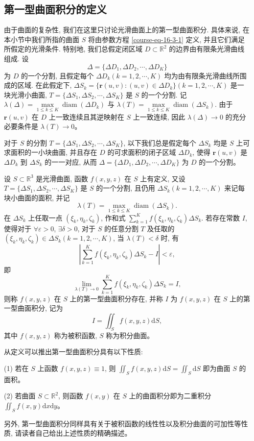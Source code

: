 \documentclass[12pt,fontset=fandol]{ctexart}
\begin{document}
\subsection{第一型曲面积分的定义}

由于曲面的复杂性, 我们在这里只讨论光滑曲面上的第一型曲面积分. 具体来说, 在本小节中我们所指的曲面 $S$ 将由参数方程 \eqref{course-eq-16-3-1}  定义, 并且它们满足所假定的光滑条件. 特别地, 我们总假定闭区域 $D\subset\mathbb R^2$ 的边界由有限条光滑曲线组成. 设
\[
  \Delta=\{\Delta D_1,\Delta D_2,\cdots,\Delta D_K\}
\]
为 $D$ 的一个分割, 且假定每个 $\Delta D_k(k=1,2,\cdots,K)$ 均为由有限条光滑曲线所围成的区域. 在此假定下, $\Delta S_k=\{\boldsymbol r(u,v):(u,v)\in\Delta D_k\}(k=1,2,\cdots,K)$ 是一块光滑小曲面, $T=\{\Delta S_1,\Delta S_2,\cdots,\Delta S_K\}$ 是 $S$ 的一个分割. 记 $\lambda(\Delta)=\max\limits_{1\leqslant k\leqslant K}\operatorname{diam}(\Delta D_k)$ 与 $\lambda(T)=\max\limits_{1\leqslant k\leqslant K}\operatorname{diam}(\Delta S_k)$. 由于 $\boldsymbol r(u,v)$ 在 $D$ 上一致连续且其逆映射在 $S$ 上一致连续, 因此 $\lambda(\Delta)\to0$ 的充分必要条件是 $\lambda(T)\to0$。

对于 $S$ 的分割 $T=\{\Delta S_1,\Delta S_2,\cdots,\Delta S_K\}$, 以下我们总是假定每个 $\Delta S_k$ 均是 $S$ 上可求面积的一小块曲面, 并且存在 $D$ 的可求面积的闭子区域 $\Delta D_k$, 使得 $\boldsymbol r(u,v)$ 是 $\Delta D_k$ 到 $\Delta S_k$ 的一一对应, 从而 $\Delta=\{\Delta D_1,\Delta D_2,\cdots,\Delta D_K\}$ 为 $D$ 的一个分割。

\begin{definition}\label{course-definition-16-3-1}\quad 设 $S\subset\mathbb R^3$ 是光滑曲面, 函数 $f(x,y,z)$ 在 $S$ 上有定义, 又设\allowbreak $T=\{\Delta S_1,\Delta S_2,\cdots,\Delta S_K\}$ 是 $S$ 的一个分割, 且仍用 $\Delta S_k(k=1,2,\cdots,K)$ 来记每块小曲面的面积, 并记
\[
  \lambda(T)=\max_{1\leqslant k\leqslant K}\operatorname{diam}(\Delta S_k).
\]
在 $\Delta S_k$ 上任取一点 $(\xi_k,\eta_k,\zeta_k)$, 作和式 $\sum\limits_{k=1}^K f(\xi_k,\eta_k,\zeta_k)\Delta S_k$. 若存在常数 $I$, 使得对于 $\forall\varepsilon>0$, $\exists\delta>0$, 对于 $S$ 的任意分割 $T$ 及任取的 $(\xi_k,\eta_k,\zeta_k)\in\Delta S_k(k=1,2,\cdots,K)$, 当 $\lambda(T)<\delta$ 时, 有
\[
  \left|\sum_{k=1}^K f(\xi_k,\eta_k,\zeta_k)\Delta S_k-I\right|<\varepsilon,
\]
即
\[
  \lim_{\lambda(T)\to0}\sum_{k=1}^K f(\xi_k,\eta_k,\zeta_k)\Delta S_k=I,
\]
则称 $f(x,y,z)$ 在 $S$ 上的第一型曲面积分存在, 并称 $I$ 为 $f(x,y,z)$ 在 $S$ 上的第一型曲面积分, 记为
\[
  I=\iint_S f(x,y,z)\mathrm dS,
\]
其中 $f(x,y,z)$ 称为被积函数, $S$ 称为积分曲面。

从定义可以推出第一型曲面积分具有以下性质:

(1) 若在 $S$ 上函数 $f(x,y,z)\equiv1$, 则 $\iint_S f(x,y,z)\mathrm dS=\iint_S\mathrm dS$ 即为曲面 $S$ 的面积。

(2) 若曲面 $S\subset\mathbb R^2$, 则函数 $f(x,y)$ 在 $S$ 上的曲面积分即为二重积分 $\iint_S f(x,y)\mathrm dx\mathrm dy$。

另外, 第一型曲面积分同样具有关于被积函数的线性性以及积分曲面的可加性等性质, 请读者自己给出上述性质的精确描述。

\end{definition}
\end{document}
